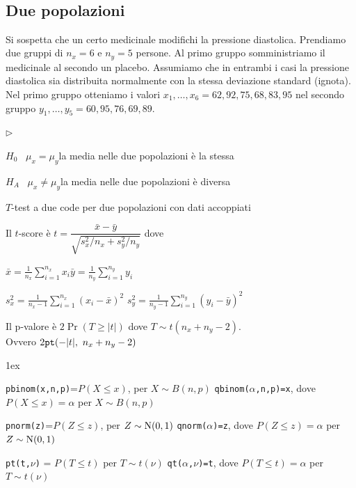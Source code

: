 \documentclass[11pt,openany]{book}
\newcommand{\mylabel}[1]{{\footnotesize\textsf{#1}}\hfill}
\renewenvironment{itemize}
  {\begin{list}{$\triangleright$}{%
   \setlength{\parskip}{0mm}
   \setlength{\topsep}{.2\baselineskip}
   \setlength{\rightmargin}{0mm}
   \setlength{\listparindent}{0mm}
   \setlength{\itemindent}{0mm}
   \setlength{\labelwidth}{3ex}
   \setlength{\itemsep}{.4\baselineskip}
   \setlength{\parsep}{0mm}
   \setlength{\partopsep}{0mm}
   \setlength{\labelsep}{1ex}
   \setlength{\leftmargin}{\labelwidth+\labelsep}
   \let\makelabel\mylabel}}{%
   \end{list}\vspace*{-1.3mm}}
\begin{document}
\clearpage\
\subsection{Due popolazioni}
Si sospetta che un certo medicinale modifichi la pressione diastolica.  Prendiamo due gruppi di $n_x=6$ e $n_y=5$ persone. Al primo gruppo somministriamo il medicinale al secondo un placebo. Assumiamo che in entrambi i casi la pressione diastolica sia distribuita normalmente con la stessa deviazione standard (ignota). Nel primo gruppo otteniamo i valori $x_1,\dots,x_6=62,92,75,68,83,95$ nel secondo gruppo $y_1,\dots,y_5=60,95,76,69,89$.

\begin{itemize}
\item[1.] $H_0$ \ $\mu_x = \mu_y$\hfill la media nelle due popolazioni è la stessa 

\item[2.] $H_A$ \ $\mu_x\neq\mu_y$\hfill la media nelle due popolazioni è diversa 


\item[3.] $T$-test a due code per due popolazioni con dati accoppiati

\item[3.] Il $t$-score è 
$t = \dfrac{\bar x - \bar y}{\sqrt{s^2_x/n_x+s^2_y/n_y}}$ dove 

$\displaystyle\bar x = \frac1{n_x}\sum^{n_x}_{i=1}x_i$\hfil$\displaystyle\bar y = \frac1{n_y}\sum^{n_y}_{i=1}y_i$


$\displaystyle s^2_x= \frac1{n_x-1}\sum^{n_x}_{i=1}(x_i-\bar x)^2$\hfil
$\displaystyle s^2_y= \frac1{n_y-1}\sum^{n_y}_{i=1}(y_i-\bar y)^2$




\item[4.] Il p-valore è $2\Pr(T\ge |t|)$ dove $T\sim t(n_x+n_y-2)$.\\ 
Ovvero $2 {\tt  pt}(-|t|,\  n_x+n_y-2)$
\end{itemize}


\vfill
\parskip1ex
{\hrulefill\scriptsize


{\tt pbinom(x,n,p)}=$P(X\le x)$, per $X\sim B(n,p)$
\hfill 
{\tt qbinom($\alpha$,n,p)=x},  dove $P(X\le x)=\alpha$ per $X\sim B(n,p)$

{\tt pnorm(z)}=$P(Z\le z)$, per $Z\sim {\rm N}(0,1)$
\hfill 
{\tt qnorm($\alpha$)=z},  dove $P(Z\le z)=\alpha$ per $Z\sim {\rm N}(0,1)$

{\tt pt(t,$\nu$)} = $P(T\le t)$ per $T\sim t(\nu)$
\hfill
{\tt qt($\alpha$,$\nu$)=t}, dove $P(T\le t)=\alpha$ per $T\sim t(\nu)$

}
\end{document}
